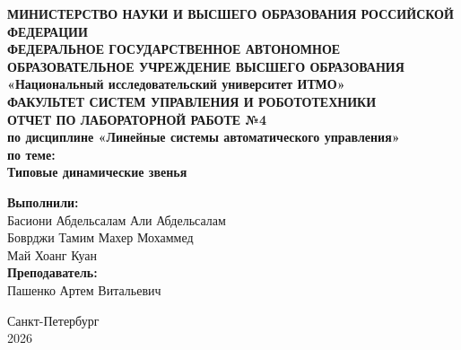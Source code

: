 \documentclass[12pt, a4paper]{article}
\begin{document}

\begin{titlepage}
    \begin{center}
        \textbf{МИНИСТЕРСТВО НАУКИ И ВЫСШЕГО ОБРАЗОВАНИЯ РОССИЙСКОЙ ФЕДЕРАЦИИ}
        \\
        \textbf{ФЕДЕРАЛЬНОЕ ГОСУДАРСТВЕННОЕ АВТОНОМНОЕ ОБРАЗОВАТЕЛЬНОЕ УЧРЕЖДЕНИЕ ВЫСШЕГО ОБРАЗОВАНИЯ}
        \\
        \textbf{«Национальный исследовательский университет ИТМО»}
        \\
        \vspace{0.5cm}
        \textbf{ФАКУЛЬТЕТ СИСТЕМ УПРАВЛЕНИЯ И РОБОТОТЕХНИКИ}
        \\
        \vspace{3cm}
        \textbf{\Large ОТЧЕТ ПО ЛАБОРАТОРНОЙ РАБОТЕ №4} \\
        \vspace{0.5cm}
        \textbf{\large по дисциплине «Линейные системы автоматического управления»} \\
        \vspace{2cm}
        \textbf{ по теме:}
        \\
        \vspace{0.5cm}
        \textbf{\Large Типовые динамические звенья}
       
    \end{center}
    
    \vspace{3cm}
    
    \begin{flushright}
        \textbf{Выполнили:} \\
        Басиони Абдельсалам Али Абдельсалам\\
        Боврджи Тамим Махер Мохаммед\\
        Май Хоанг Куан \\
        
        
        \vspace{0.5cm}
        \textbf{Преподаватель:} \\
        Пашенко Артем Витальевич



    \end{flushright}
    
    \vfill
    
    \begin{center}
        Санкт-Петербург \\
        2026
    \end{center}
\end{titlepage}
\tableofcontents
\end{document}
